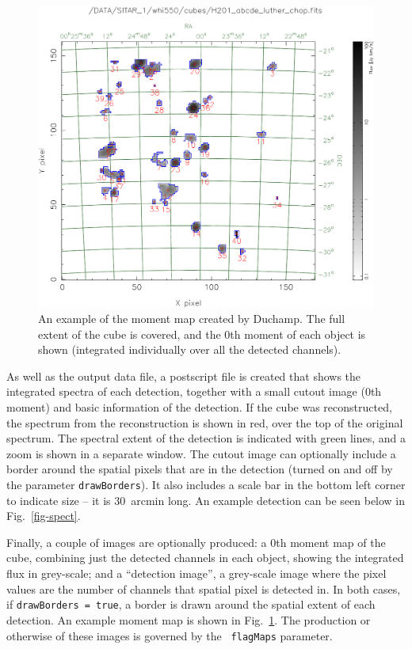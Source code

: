 \documentclass[12pt,a4paper]{article}
\begin{document}
\begin{figure}[!t]
\begin{center}
\includegraphics[width=\textwidth]{example_moment_map}
\end{center}
\caption{\footnotesize An example of the moment map created by
  Duchamp. The full extent of the cube is covered, and the 0th moment
  of each object is shown (integrated individually over all the
  detected channels).}
\label{fig-moment}
\end{figure}

As well as the output data file, a postscript file is created that
shows the integrated spectra of each detection, together with a small
cutout image (0th moment) and basic information of the detection. If
the cube was reconstructed, the spectrum from the reconstruction is
shown in red, over the top of the original spectrum. The spectral
extent of the detection is indicated with green lines, and a zoom is
shown in a separate window. The cutout image can optionally include a
border around the spatial pixels that are in the detection (turned on
and off by the parameter {\tt drawBorders}). It also includes a scale
bar in the bottom left corner to indicate size -- it is 30~arcmin
long. An example detection can be seen below in Fig.~\ref{fig-spect}.

Finally, a couple of images are optionally produced: a 0th moment map
of the cube, combining just the detected channels in each object,
showing the integrated flux in grey-scale; and a ``detection image'',
a grey-scale image where the pixel values are the number of channels
that spatial pixel is detected in. In both cases, if {\tt drawBorders =
true}, a border is drawn around the spatial extent of each
detection. An example moment map is shown in Fig.~\ref{fig-moment}.
The production or otherwise of these images is governed by the {\tt
flagMaps} parameter.
\end{document}
